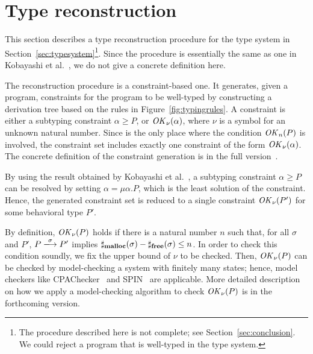 \section{Type reconstruction}
\label{sec:reconstruction}


This section describes a type reconstruction procedure for the type
system in Section~\ref{sec:typesystem}\footnote{The procedure
  described here is not complete; see Section~\ref{sec:conclusion}.
  We could reject a program that is well-typed in the type system.}.
Since the procedure is essentially the same as one in Kobayashi et
al.~\cite{DBLP:journals/lmcs/KobayashiSW06}, we do not give a concrete
definition here.

The reconstruction procedure is a constraint-based one.  It generates,
given a program, constraints for the program to be well-typed by
constructing a derivation tree based on the rules in
Figure~\ref{fig:typingrules}.  A constraint is either a subtyping
constraint \(\alpha \ge P\), or \(\mathit{OK}_\nu(\alpha)\), where \(\nu\) is
a symbol for an unknown natural number.  Since  is the only
place where the condition \(\mathit{OK}_n(P)\) is involved, the constraint set
includes exactly one constraint of the form \(\mathit{OK}_\nu(\alpha)\).  The
concrete definition of the constraint generation is in the full
version~\cite{fullversion}.

By using the result obtained by Kobayashi et al.~\cite[Lemma
  3.8]{DBLP:journals/lmcs/KobayashiSW06}, a subtyping constraint
\(\alpha \ge P\) can be resolved by setting \(\alpha = \mu
\alpha. P\), which is the least solution of the constraint.  Hence,
the generated constraint set is reduced to a single constraint
\(\mathit{OK}_{\nu}(P')\) for some behavioral type \(P'\).

By definition, \(\mathit{OK}_{\nu}(P)\) holds if there is a natural number
\(n\) such that, for all \(\sigma\) and \(P'\), \(P
\xlongrightarrow{\sigma} P'\) implies \(\sharp_{\mathbf{malloc}}(\sigma) -
\sharp_{\mathbf{free}}(\sigma) \le n\).  In order to check this condition
soundly, we fix the upper bound of \(\nu\) to be checked.  Then,
\(\mathit{OK}_{\nu}(P)\) can be checked by model-checking a system with
finitely many states; hence, model checkers like
CPAChecker~\cite{beyer2011cpachecker} and
SPIN~\cite{holzmann2004spin,ben2008principles} are
applicable.  More detailed description on how we apply a
model-checking algorithm to check \(\mathit{OK}_\nu(P)\) is in the forthcoming
version.


